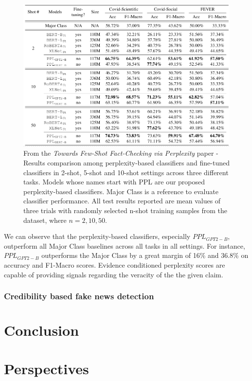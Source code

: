 \documentclass[10pt, english]{report}
\begin{document}
\begin{figure}[H]
	\centering
	\includegraphics[scale=0.43]{img/few_shots_perplexity_evaluation.png}
	\caption{From the \textit{Towards Few-Shot Fact-Checking via Perplexity} paper - Results comparison among perplexity-based classifiers and fine-tuned classifiers in 2-shot, 5-shot and 10-shot settings across three different tasks. Models whose names start with PPL are our proposed perplexity-based classifiers. Major Class is a reference to evaluate classifier performance. All test results reported are mean values of three trials with randomly selected n-shot training samples from the dataset, where $n={2, 10, 50}$.}
\end{figure}

We can observe that the perplexity-based classifiers, especially $PPL_{GPT2-B}$, outperform all Major Class baselines across all
tasks in all settings. For instance, $PPL_{GPT2-B}$ outperforms the Major Class by a great margin of
16\% and 36.8\% on accuracy and F1-Macro scores. Evidence conditioned perplexity scores are capable of providing signals regarding the veracity of the the given claim.

\subsection{Credibility based fake news detection}




\chapter{Conclusion}


\chapter{Perspectives}




\end{document}
